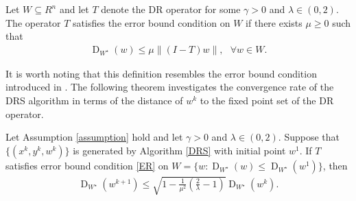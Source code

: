 \documentclass[ijoc,sglanonrev]{informs4}
\DeclareMathOperator{\dist}{D}
\begin{document}
  \begin{definition}
Let $W\subseteq{R}^n$ and let $T$ denote the DR operator for some $\gamma>0$ and $\lambda\in (0, 2)$. The operator $T$ satisfies the error bound condition on $W$ if there exists $\mu\geq0$ such that 
\begin{align}\label{ER}
  \dist_{W^\star}(w)\leq \mu\left\| (I-T)w\right\|, \ \ \   \forall w\in W. 
\end{align}
  \end{definition}
  
It is worth noting that this definition resembles the error bound condition introduced in \cite{luo1992linear}. The following theorem investigates the convergence rate of the DRS algorithm in terms of the distance of $w^k$ to the fixed point set of the DR operator. 

\begin{theorem}\label{Th.L}
Let Assumption \ref{assumption} hold and let $\gamma>0$ and $\lambda\in (0, 2)$. Suppose that $\{(x^k, y^k, w^k)\}$ is generated by  Algorithm \ref{DRS} with initial point $w^1$.  If $T$ satisfies  error bound condition \eqref{ER} on $W=\{w: \dist_{W^\star}(w)\leq  \dist_{W^\star}(w^1)\}$, then 
\begin{align*}
\dist_{W^\star}(w^{k+1})\leq \sqrt{ 1-\tfrac{1}{\mu^2}(\tfrac{2}{\lambda}-1)}   \dist_{W^\star}(w^k).
\end{align*}
\end{theorem}
\end{document}
